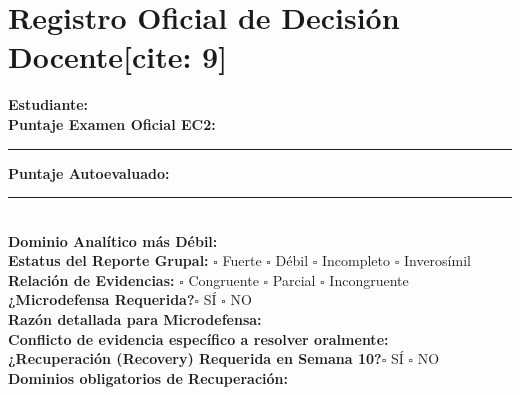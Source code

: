\documentclass[11pt, a4paper]{article}
\begin{document}
\section*{Registro Oficial de Decisión Docente[cite: 9]}
\textbf{Estudiante:} \hrulefill \\[0.2cm]
\textbf{Puntaje Examen Oficial EC2:} \rule{2cm}{0.15mm} \quad \textbf{Puntaje Autoevaluado:} \rule{2cm}{0.15mm} \\[0.2cm]
\textbf{Dominio Analítico más Débil:} \hrulefill \\[0.2cm]
\textbf{Estatus del Reporte Grupal:} $\square$ Fuerte \quad $\square$ Débil \quad $\square$ Incompleto \quad $\square$ Inverosímil \\[0.2cm]
\textbf{Relación de Evidencias:} $\square$ Congruente \quad $\square$ Parcial \quad $\square$ Incongruente\\[0.4cm]
\textbf{¿Microdefensa Requerida?}\quad $\square$ SÍ \quad $\square$ NO \\[0.2cm]
\textbf{Razón detallada para Microdefensa:} \hrulefill \\[0.2cm]
\textbf{Conflicto de evidencia específico a resolver oralmente:} \hrulefill \\[0.4cm]
\textbf{¿Recuperación (Recovery) Requerida en Semana 10?}\quad $\square$ SÍ \quad $\square$ NO \\[0.2cm]
\textbf{Dominios obligatorios de Recuperación:} \hrulefill
\end{document}
